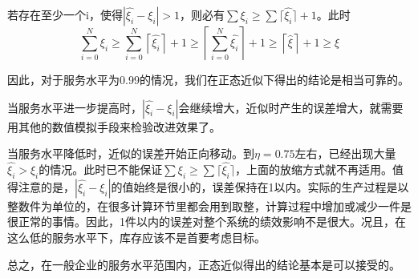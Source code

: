若存在至少一个i，使得$|\hat{\xi_i}-\xi_i| > 1$，则必有$\sum\xi_i \geq \sum\lceil\hat{\xi_i}\rceil + 1$。此时
\begin{equation}
\sum_{i=0}^N \xi_i \geq \sum_{i=0}^N\left\lceil\hat{\xi_i}\right\rceil + 1 \geq \left\lceil\sum_{i=0}^N\hat{\xi_i}\right\rceil + 1 \geq \left\lceil\hat{\xi}\right\rceil + 1 \geq \xi
\end{equation}

因此，对于服务水平为0.99的情况，我们在正态近似下得出的结论是相当可靠的。

当服务水平进一步提高时，$|\hat{\xi_i}-\xi_i|$会继续增大，近似时产生的误差增大，就需要用其他的数值模拟手段来检验改进效果了。

当服务水平降低时，近似的误差开始正向移动。到$\eta=0.75$左右，已经出现大量$\hat{\xi_i} > \xi_i$的情况。此时已不能保证$\sum\xi_i \geq \sum\lceil\hat{\xi_i}\rceil$，上面的放缩方式就不再适用。值得注意的是，$|\hat{\xi_i}-\xi_i|$的值始终是很小的，误差保持在1以内。实际的生产过程是以整数件为单位的，在很多计算环节里都会用到取整，计算过程中增加或减少一件是很正常的事情。因此，1件以内的误差对整个系统的绩效影响不是很大。况且，在这么低的服务水平下，库存应该不是首要考虑目标。

总之，在一般企业的服务水平范围内，正态近似得出的结论基本是可以接受的。






